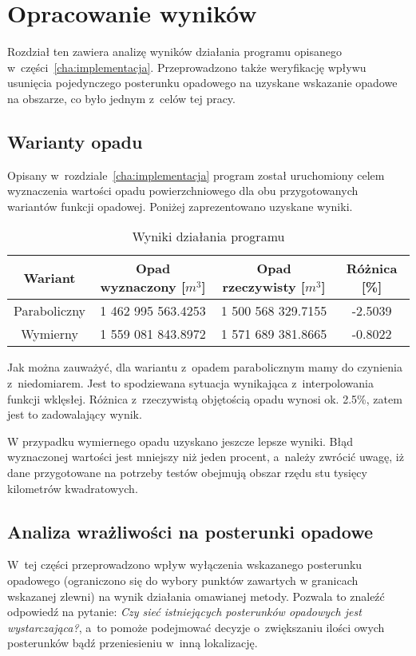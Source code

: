 \chapter{Opracowanie wyników}

Rozdział ten zawiera analizę wyników działania programu opisanego w~części~\ref{cha:implementacja}. Przeprowadzono także weryfikację wpływu usunięcia pojedynczego posterunku opadowego na uzyskane wskazanie opadowe na obszarze, co było jednym z~celów tej pracy.

\section{Warianty opadu}
Opisany w~rozdziale~\ref{cha:implementacja} program został uruchomiony celem wyznaczenia wartości opadu powierzchniowego dla obu przygotowanych wariantów funkcji opadowej. Poniżej zaprezentowano uzyskane wyniki.

\begin{table}[!ht]
\caption{Wyniki działania programu}
\begin{center}
\begin{tabular}{|c|c|c|c|}
\hline
 Wariant      & Opad wyznaczony [$m^3$] & Opad rzeczywisty [$m^3$] & Różnica [\%] \\ \hline \hline

 Paraboliczny & 1 462 995 563.4253  &   1 500 568 329.7155  &  -2.5039 \\ \hline
 Wymierny     & 1 559 081 843.8972  &   1 571 689 381.8665  &  -0.8022 \\ \hline

\end{tabular}
\end{center}
\end{table}

Jak można zauważyć, dla wariantu z~opadem parabolicznym mamy do czynienia z~niedomiarem. Jest to spodziewana sytuacja wynikająca z~interpolowania funkcji wklęsłej. Różnica z~rzeczywistą objętością opadu wynosi ok. 2.5\%, zatem jest to zadowalający wynik.

W przypadku wymiernego opadu uzyskano jeszcze lepsze wyniki. Błąd wyznaczonej wartości jest mniejszy niż jeden procent, a~należy zwrócić uwagę, iż dane przygotowane na potrzeby testów obejmują obszar rzędu stu tysięcy kilometrów kwadratowych.



\section{Analiza wrażliwości na posterunki opadowe}
W~tej części przeprowadzono wpływ wyłączenia wskazanego posterunku opadowego (ograniczono się do wybory punktów zawartych w granicach wskazanej zlewni) na wynik działania omawianej metody. Pozwala to znaleźć odpowiedź na pytanie: \textit{Czy sieć istniejących posterunków opadowych jest wystarczająca?}, a~to pomoże podejmować decyzje o~zwiększaniu ilości owych posterunków bądź przeniesieniu w~inną lokalizację.



